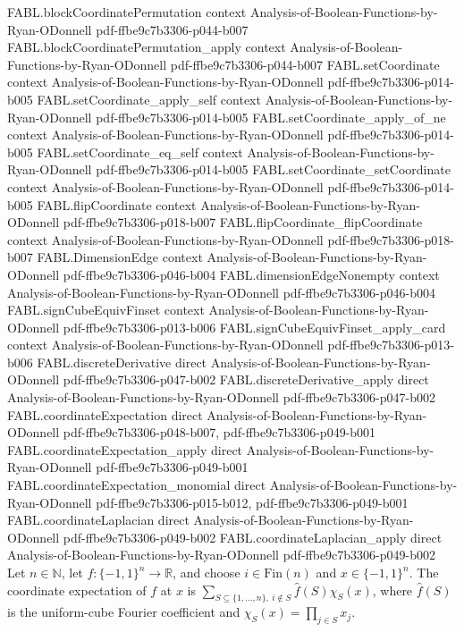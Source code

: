 \begin{theorem}
\proofstep
  {FABL.blockCoordinatePermutation}
  {context}
  {Analysis-of-Boolean-Functions-by-Ryan-ODonnell}
  {pdf-ffbe9c7b3306-p044-b007}
\proofstep
  {FABL.blockCoordinatePermutation_apply}
  {context}
  {Analysis-of-Boolean-Functions-by-Ryan-ODonnell}
  {pdf-ffbe9c7b3306-p044-b007}
\proofstep
  {FABL.setCoordinate}
  {context}
  {Analysis-of-Boolean-Functions-by-Ryan-ODonnell}
  {pdf-ffbe9c7b3306-p014-b005}
\proofstep
  {FABL.setCoordinate_apply_self}
  {context}
  {Analysis-of-Boolean-Functions-by-Ryan-ODonnell}
  {pdf-ffbe9c7b3306-p014-b005}
\proofstep
  {FABL.setCoordinate_apply_of_ne}
  {context}
  {Analysis-of-Boolean-Functions-by-Ryan-ODonnell}
  {pdf-ffbe9c7b3306-p014-b005}
\proofstep
  {FABL.setCoordinate_eq_self}
  {context}
  {Analysis-of-Boolean-Functions-by-Ryan-ODonnell}
  {pdf-ffbe9c7b3306-p014-b005}
\proofstep
  {FABL.setCoordinate_setCoordinate}
  {context}
  {Analysis-of-Boolean-Functions-by-Ryan-ODonnell}
  {pdf-ffbe9c7b3306-p014-b005}
\proofstep
  {FABL.flipCoordinate}
  {context}
  {Analysis-of-Boolean-Functions-by-Ryan-ODonnell}
  {pdf-ffbe9c7b3306-p018-b007}
\proofstep
  {FABL.flipCoordinate_flipCoordinate}
  {context}
  {Analysis-of-Boolean-Functions-by-Ryan-ODonnell}
  {pdf-ffbe9c7b3306-p018-b007}
\proofstep
  {FABL.DimensionEdge}
  {context}
  {Analysis-of-Boolean-Functions-by-Ryan-ODonnell}
  {pdf-ffbe9c7b3306-p046-b004}
\proofstep
  {FABL.dimensionEdgeNonempty}
  {context}
  {Analysis-of-Boolean-Functions-by-Ryan-ODonnell}
  {pdf-ffbe9c7b3306-p046-b004}
\proofstep
  {FABL.signCubeEquivFinset}
  {context}
  {Analysis-of-Boolean-Functions-by-Ryan-ODonnell}
  {pdf-ffbe9c7b3306-p013-b006}
\proofstep
  {FABL.signCubeEquivFinset_apply_card}
  {context}
  {Analysis-of-Boolean-Functions-by-Ryan-ODonnell}
  {pdf-ffbe9c7b3306-p013-b006}
\proofstep
  {FABL.discreteDerivative}
  {direct}
  {Analysis-of-Boolean-Functions-by-Ryan-ODonnell}
  {pdf-ffbe9c7b3306-p047-b002}
\proofstep
  {FABL.discreteDerivative_apply}
  {direct}
  {Analysis-of-Boolean-Functions-by-Ryan-ODonnell}
  {pdf-ffbe9c7b3306-p047-b002}
\proofstep
  {FABL.coordinateExpectation}
  {direct}
  {Analysis-of-Boolean-Functions-by-Ryan-ODonnell}
  {pdf-ffbe9c7b3306-p048-b007,
    pdf-ffbe9c7b3306-p049-b001}
\proofstep
  {FABL.coordinateExpectation_apply}
  {direct}
  {Analysis-of-Boolean-Functions-by-Ryan-ODonnell}
  {pdf-ffbe9c7b3306-p049-b001}
\proofstep
  {FABL.coordinateExpectation_monomial}
  {direct}
  {Analysis-of-Boolean-Functions-by-Ryan-ODonnell}
  {pdf-ffbe9c7b3306-p015-b012,
    pdf-ffbe9c7b3306-p049-b001}
\proofstep
  {FABL.coordinateLaplacian}
  {direct}
  {Analysis-of-Boolean-Functions-by-Ryan-ODonnell}
  {pdf-ffbe9c7b3306-p049-b002}
\proofstep
  {FABL.coordinateLaplacian_apply}
  {direct}
  {Analysis-of-Boolean-Functions-by-Ryan-ODonnell}
  {pdf-ffbe9c7b3306-p049-b002}
Let $n\in\mathbb N$, let $f:\{−1,1\}^n\to\mathbb R$, and choose $i\in\mathrm{Fin}(n)$
and $x\in\{−1,1\}^n$. The coordinate expectation of $f$ at $x$ is
$\sum_{S\subseteq\{1,\ldots,n\},\ i\notin S}\widehat f(S)\chi_S(x)$, where $\widehat
f(S)$ is the uniform-cube Fourier coefficient and $\chi_S(x)=\prod_{j\in S}x_j$.
\end{theorem}

